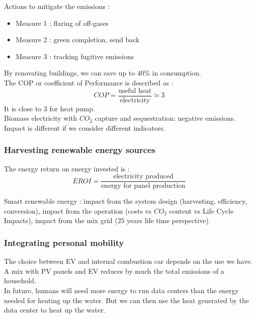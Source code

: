 \documentclass[../main.tex]{subfiles}
\begin{document}
Actions to mitigate the emissions : \begin{itemize}
    \item Measure 1 : flaring of off-gases
    \item Measure 2 : green completion, send back
    \item Measure 3 : tracking fugitive emissions
\end{itemize}

By renovating buildings, we can save up to $40\%$ in consumption. \\

The COP or coefficient of Performance is described as : \begin{equation}
    COP = \frac{\text{useful heat}}{\text{electricity}} \simeq 3
\end{equation}
It is close to 3 for heat pump.\\

Biomass electricity with $CO_2$ capture and sequestration: negative emissions. \\
\warning Impact is different if we consider different indicators. \\

\subsubsection{Harvesting renewable energy sources}

The energy return on energy invested is : \begin{equation}
    EROI = \frac{\text{electricity produced}}{\text{energy for panel production}}
\end{equation}

Smart renewable energy : impact from the system design (harvesting, efficiency, conversion), impact from the operation (costs vs $CO_2$ content vs Life Cycle Impacts), impact from the mix grid (25 years life time perspective).\\

\subsubsection{Integrating personal mobility}
The choice between EV and internal combustion car depends on the use we have. \\
A mix with PV panels and EV reduces by much the total emissions of a household.\\
In future, humans will need more energy to run data centers than the energy needed for heating up the water. But we can then use the heat generated by the data center to heat up the water.\\
\end{document}
